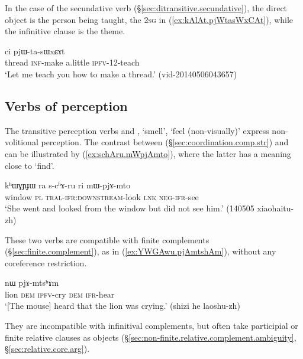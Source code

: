 In the case of the secundative verb  (§\ref{sec:ditransitive.secundative}), the direct object is the person being taught, the \textsc{2sg} in (\ref{ex:kAlAt.pjWtasWxCAt}), while the infinitive clause is the theme.

\begin{exe}
\ex \label{ex:kAlAt.pjWtasWxCAt}
  ci pjɯ-ta-sɯxɕɤt \\
 thread \textsc{inf}-make a.little \textsc{ipfv}-1\fl{}2-teach \\
 \glt `Let me teach you how to make a thread.' (vid-20140506043657)
  \end{exe}
  
 \subsection{Verbs of perception}   \label{sec:mto.mtshAm.complement}
The transitive perception verbs  and , `smell', `feel (non-visually)' express non-volitional perception. The contrast between  (§\ref{sec:coordination.comp.str}) and  can be illustrated by (\ref{ex:schAru.mWpjAmto}), where the latter has a meaning close to `find'.

\begin{exe}
\ex \label{ex:schAru.mWpjAmto}
 \gll kʰɯɣɲɟɯ ra s-cʰɤ-ru ri mɯ-pjɤ-mto \\
 window \textsc{pl} \textsc{tral}-\textsc{ifr}:\textsc{downstream}-look \textsc{lnk} \textsc{neg}-\textsc{ifr}-see \\
 \glt `She went and looked from the window but did not see him.' (140505 xiaohaitu-zh)
\end{exe}

These two verbs are compatible with finite complements (§\ref{sec:finite.complement}), as in (\ref{ex:YWGAwu.pjAmtshAm}), without any coreference restriction. 

\begin{exe}
\ex \label{ex:YWGAwu.pjAmtshAm}
  nɯ pjɤ-mtsʰɤm \\
 lion \textsc{dem} \textsc{ipfv}-cry \textsc{dem} \textsc{ifr}-hear \\
 \glt `[The mouse] heard that the lion was crying.' (shizi he laoshu-zh)
\end{exe}

They are incompatible with infinitival complements, but often take participial or finite relative clauses as objects (§\ref{sec:non-finite.relative.complement.ambiguity}, §\ref{sec:relative.core.arg}). 

